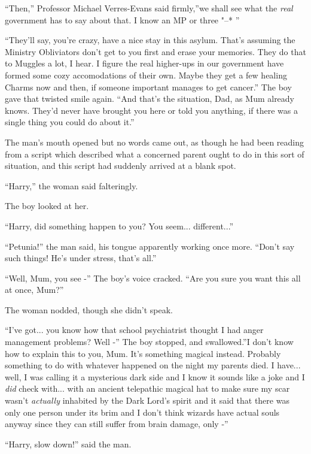 ``Then,'' Professor Michael Verres-Evans said firmly,''we shall see what
the \emph{real} government has to say about that. I know an MP or three
"--* ''

``They'll say, you're crazy, have a nice stay in this asylum. That's
assuming the Ministry Obliviators don't get to you first and erase your
memories. They do that to Muggles a lot, I hear. I figure the real
higher-ups in our government have formed some cozy accomodations of
their own. Maybe they get a few healing Charms now and then, if someone
important manages to get cancer.'' The boy gave that twisted smile
again. ``And that's the situation, Dad, as Mum already knows. They'd
never have brought you here or told you anything, if there was a single
thing you could do about it.''

The man's mouth opened but no words came out, as though he had been
reading from a script which described what a concerned parent ought to
do in this sort of situation, and this script had suddenly arrived at a
blank spot.

``Harry,'' the woman said falteringly.

The boy looked at her.

``Harry, did something happen to you? You seem...
different...''

``Petunia!'' the man said, his tongue apparently working once more.
``Don't say such things! He's under stress, that's all.''

``Well, Mum, you see -'' The boy's voice cracked. ``Are you sure you
want this all at once, Mum?''

The woman nodded, though she didn't speak.

``I've got... you know how that school psychiatrist thought I had
anger management problems? Well -'' The boy stopped, and swallowed.''I
don't know how to explain this to you, Mum. It's something magical
instead. Probably something to do with whatever happened on the night my
parents died. I have... well, I was calling it a mysterious dark
side and I know it sounds like a joke and I \emph{did} check
with... with an ancient telepathic magical hat to make sure my scar
wasn't \emph{actually} inhabited by the Dark Lord's spirit and it said
that there was only one person under its brim and I don't think wizards
have actual souls anyway since they can still suffer from brain damage,
only -''

``Harry, slow down!'' said the man.

